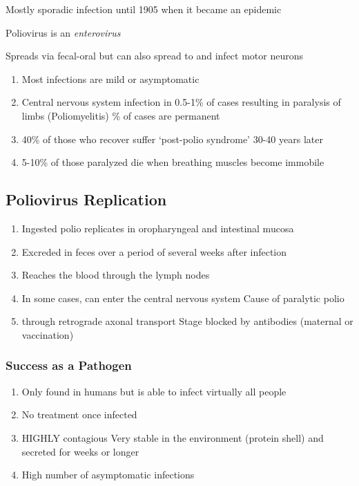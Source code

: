 \documentclass{notes}
\begin{document}
Mostly sporadic infection until 1905 when it became an epidemic

Poliovirus is an \textit{enterovirus}

\tab Spreads via fecal-oral but can also spread to and infect motor neurons

\begin{enumerate}
    \item Most infections are mild or asymptomatic
    \item Central nervous system infection in 0.5-1\% of cases resulting in paralysis of limbs (Poliomyelitis)
    \% of cases are permanent
    \item 40\% of those who recover suffer `post-polio syndrome' 30-40 years later
    \item 5-10\% of those paralyzed die when breathing muscles become immobile
\end{enumerate}

\subsection{Poliovirus Replication}

\begin{enumerate}
    \item Ingested polio replicates in oropharyngeal and intestinal mucosa
    \item Excreded in feces over a period of several weeks after infection
    \item Reaches the blood through the lymph nodes
    \item In some cases, can enter the central nervous system
    \subitem Cause of paralytic polio
    \item through retrograde axonal transport
    \subitem Stage blocked by antibodies (maternal or vaccination)
\end{enumerate}

\subsubsection{Success as a Pathogen}

\begin{enumerate}
    \item Only found in humans but is able to infect virtually all people
    \item No treatment once infected
    \item HIGHLY contagious
    \subitem Very stable in the environment (protein shell) and secreted for weeks or longer
    \item High number of asymptomatic infections
\end{enumerate}
\end{document}
